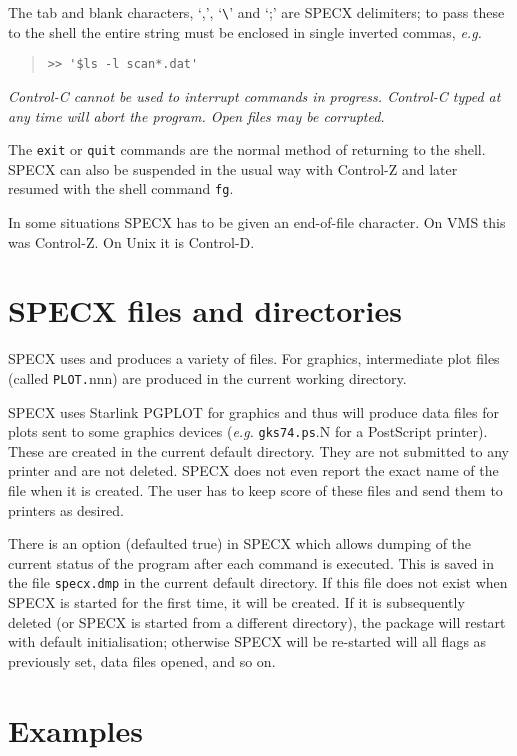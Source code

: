 \documentclass[twoside,11pt]{article}
\renewcommand{\_}{\texttt{\symbol{95}}}
\newenvironment{myquote}{\begin{quote}\begin{small}}{\end{small}\end{quote}}
\begin{document}
The tab and blank characters, `,', `\verb+\+' and `;' are SPECX delimiters;
to pass these to the shell the entire string must be enclosed in single 
inverted commas, {\em e.g.}

\begin{myquote}
\begin{verbatim}
>> '$ls -l scan*.dat'
\end{verbatim}
\end{myquote}

\emph{Control-C cannot be used to interrupt commands in progress.
Control-C typed at any time will abort the program. Open files may be
corrupted.}

The {\tt exit} or \texttt{quit} commands are the normal method of returning to
the shell.  SPECX can also be suspended in the usual way with Control-Z and
later resumed with the shell command {\tt fg}.

In some situations SPECX has to be given an end-of-file character. On
VMS this was Control-Z. On Unix it is Control-D.


\section {SPECX files and directories}

SPECX uses and produces a variety of files. For graphics, 
intermediate plot files (called {\tt PLOT.}nnn) are produced in the
current working directory.

SPECX uses Starlink PGPLOT for graphics and thus will produce data files for
plots sent to some graphics devices ({\em e.g.} {\tt gks74.ps}.N for a
PostScript printer). These are created in the current default directory. They
are not submitted to any printer and are not deleted. SPECX does not even
report the exact name of the file when it is created. The user has to keep
score of these files and send them to printers as desired.

There is an option (defaulted true) in SPECX which allows dumping of the
current status of the program after each command is executed. This is saved in
the file {\tt specx.dmp} in the current default directory. If this file does
not exist when SPECX is started for the first time, it will be created. If it
is subsequently deleted (or SPECX is started from a different directory), the
package will restart with default initialisation; otherwise SPECX will be
re-started will all flags as previously set, data files opened, and so on.


\section {Examples}
\end{document}
